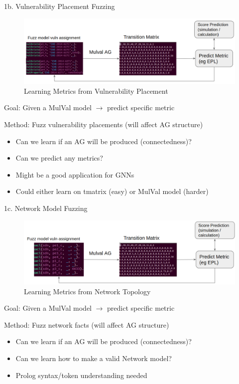 1b. Vulnerability Placement Fuzzing 

\begin{figure}[ht]
\centering
\includegraphics[width=.9\textwidth]{resource/img/ch_future/1b.png}
\caption{Learning Metrics from Vulnerability Placement}
\label{fig:final:1b}
\end{figure} 

Goal: Given a MulVal model $\longrightarrow$ predict specific metric

Method: Fuzz vulnerability placements (will affect AG structure)

\begin{itemize}
\item Can we learn if an AG will be produced (connectedness)?
\item Can we predict any metrics?
\item Might be a good application for GNNs 
\item Could either learn on tmatrix (easy) or MulVal model (harder)
\end{itemize}




1c. Network Model Fuzzing 


\begin{figure}[ht]
\centering
\includegraphics[width=.9\textwidth]{resource/img/ch_future/1c.png}
\caption{Learning Metrics from Network Topology}
\label{fig:final:1c}
\end{figure} 


Goal: Given a MulVal model $\longrightarrow$ predict specific metric

Method: Fuzz network facts (will affect AG structure)
\begin{itemize}
\item Can we learn if an AG will be produced (connectedness)?
\item Can we learn how to make a valid Network model?
\item Prolog syntax/token understanding needed
\end{itemize}


